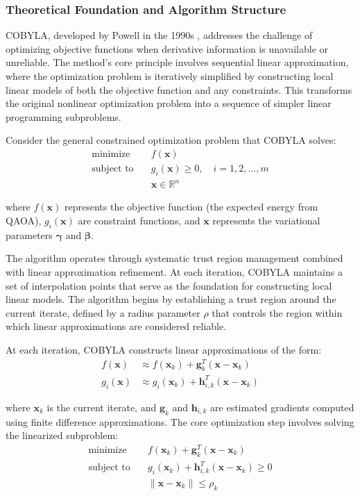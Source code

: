 \documentclass[%
 reprint,
 amsmath,amssymb,
 aps,
]{revtex4-2}
\begin{document}
\subsubsection{Theoretical Foundation and Algorithm Structure}

COBYLA, developed by Powell in the 1990s \cite{powell1998direct}, addresses the challenge of optimizing objective functions when derivative information is unavailable or unreliable. The method's core principle involves sequential linear approximation, where the optimization problem is iteratively simplified by constructing local linear models of both the objective function and any constraints. This transforms the original nonlinear optimization problem into a sequence of simpler linear programming subproblems.

Consider the general constrained optimization problem that COBYLA solves:
\begin{align}
\text{minimize} \quad & f(\mathbf{x}) \\
\text{subject to} \quad & g_i(\mathbf{x}) \geq 0, \quad i = 1, 2, \ldots, m \\
& \mathbf{x} \in \mathbb{R}^n
\end{align}

where $f(\mathbf{x})$ represents the objective function (the expected energy from QAOA), $g_i(\mathbf{x})$ are constraint functions, and $\mathbf{x}$ represents the variational parameters $\boldsymbol{\gamma}$ and $\boldsymbol{\beta}$.

The algorithm operates through systematic trust region management combined with linear approximation refinement. At each iteration, COBYLA maintains a set of interpolation points that serve as the foundation for constructing local linear models. The algorithm begins by establishing a trust region around the current iterate, defined by a radius parameter $\rho$ that controls the region within which linear approximations are considered reliable.

At each iteration, COBYLA constructs linear approximations of the form:
\begin{align}
f(\mathbf{x}) &\approx f(\mathbf{x}_k) + \mathbf{g}_k^T(\mathbf{x} - \mathbf{x}_k) \\
g_i(\mathbf{x}) &\approx g_i(\mathbf{x}_k) + \mathbf{h}_{i,k}^T(\mathbf{x} - \mathbf{x}_k)
\end{align}

where $\mathbf{x}_k$ is the current iterate, and $\mathbf{g}_k$ and $\mathbf{h}_{i,k}$ are estimated gradients computed using finite difference approximations. The core optimization step involves solving the linearized subproblem:
\begin{align}
\text{minimize} \quad & f(\mathbf{x}_k) + \mathbf{g}_k^T(\mathbf{x} - \mathbf{x}_k) \\
\text{subject to} \quad & g_i(\mathbf{x}_k) + \mathbf{h}_{i,k}^T(\mathbf{x} - \mathbf{x}_k) \geq 0 \\
& \|\mathbf{x} - \mathbf{x}_k\| \leq \rho_k
\end{align}
\end{document}
